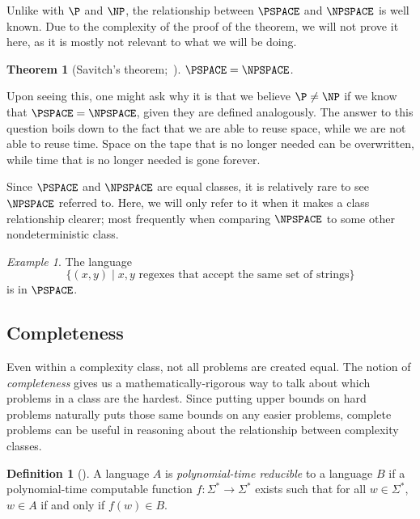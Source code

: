 \documentclass[english]{reedthesis}
\theoremstyle{plain}
\newtheorem{thm}{Theorem}[section]
\theoremstyle{definition}
\newtheorem{defn}[defn]{Definition}
\theoremstyle{remark}
\newtheorem{example}{Example}[thm]
\begin{document}
Unlike with $\P$ and $\NP$, the relationship between $\PSPACE$ and $\NPSPACE$ is
well known. Due to the complexity of the proof of the theorem, we will not prove
it here, as it is mostly not relevant to what we will be doing.

\begin{thm}[{Savitch's theorem;~\cite{Sav70}}]\label{thm:savitch}
  $\PSPACE = \NPSPACE$.
\end{thm}

Upon seeing this, one might ask why it is that we believe $\P \ne \NP$ if we know
that $\PSPACE = \NPSPACE$, given they are defined analogously. The answer to
this question boils down to the fact that we are able to reuse space, while we
are not able to reuse time. Space on the tape that is no longer needed can be
overwritten, while time that is no longer needed is gone forever.

Since $\PSPACE$ and $\NPSPACE$ are equal classes, it is relatively rare to see
$\NPSPACE$ referred to. Here, we will only refer to it when it makes a class
relationship clearer; most frequently when comparing $\NPSPACE$ to some other
nondeterministic class.

\begin{example}\label{ex:regex-is-pspace}
  The language
  \[
    \{(x, y) \mid x, y \text{ regexes that accept the same set of strings}\}
  \]
  is in $\PSPACE$. %
\end{example}



\subsection{Completeness}

Even within a complexity class, not all problems are created equal. The notion
of \emph{completeness} gives us a mathematically-rigorous way to talk about
which problems in a class are the hardest. Since putting upper bounds on hard
problems naturally puts those same bounds on any easier problems, complete
problems can be useful in reasoning about the relationship between complexity
classes.

\begin{defn}[{\cite[Def.\ 7.29]{Sip97}}]\label{def:p-reduction}
  A language $A$ is \emph{polynomial-time reducible} to a language $B$ if a
  polynomial-time computable function $f: \Sigma^{*} \rightarrow \Sigma^{*}$ exists such that for
  all $w \in \Sigma^{*}$, $w \in A$ if and only if $f(w) \in B$.
\end{defn}
\end{document}
